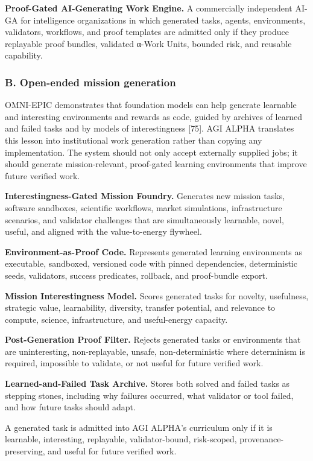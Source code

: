 \documentclass[
  11pt,
]{article}
\begin{document}
\textbf{Proof-Gated AI-Generating Work Engine.} A commercially
independent AI-GA for intelligence organizations in which generated
tasks, agents, environments, validators, workflows, and proof templates
are admitted only if they produce replayable proof bundles, validated
α-Work Units, bounded risk, and reusable capability.

\subsubsection{B. Open-ended mission
generation}\label{b.-open-ended-mission-generation}

OMNI-EPIC demonstrates that foundation models can help generate
learnable and interesting environments and rewards as code, guided by
archives of learned and failed tasks and by models of interestingness
{[}75{]}. AGI ALPHA translates this lesson into institutional work
generation rather than copying any implementation. The system should not
only accept externally supplied jobs; it should generate
mission-relevant, proof-gated learning environments that improve future
verified work.

\textbf{Interestingness-Gated Mission Foundry.} Generates new mission
tasks, software sandboxes, scientific workflows, market simulations,
infrastructure scenarios, and validator challenges that are
simultaneously learnable, novel, useful, and aligned with the
value-to-energy flywheel.

\textbf{Environment-as-Proof Code.} Represents generated learning
environments as executable, sandboxed, versioned code with pinned
dependencies, deterministic seeds, validators, success predicates,
rollback, and proof-bundle export.

\textbf{Mission Interestingness Model.} Scores generated tasks for
novelty, usefulness, strategic value, learnability, diversity, transfer
potential, and relevance to compute, science, infrastructure, and
useful-energy capacity.

\textbf{Post-Generation Proof Filter.} Rejects generated tasks or
environments that are uninteresting, non-replayable, unsafe,
non-deterministic where determinism is required, impossible to validate,
or not useful for future verified work.

\textbf{Learned-and-Failed Task Archive.} Stores both solved and failed
tasks as stepping stones, including why failures occurred, what
validator or tool failed, and how future tasks should adapt.

A generated task is admitted into AGI ALPHA's curriculum only if it is
learnable, interesting, replayable, validator-bound, risk-scoped,
provenance-preserving, and useful for future verified work.
\end{document}

